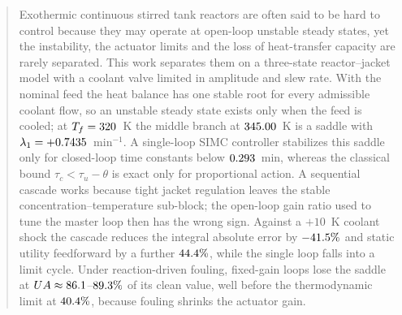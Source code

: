 \begin{abstract}
Exothermic continuous stirred tank reactors are often said to be hard to control because they may operate at open-loop unstable steady states, yet the instability, the actuator limits and the loss of heat-transfer capacity are rarely separated. This work separates them on a three-state reactor--jacket model with a coolant valve limited in amplitude and slew rate. With the nominal feed the heat balance has one stable root for every admissible coolant flow, so an unstable steady state exists only when the feed is cooled; at $T_f=\TfSad$~K the middle branch at $\TSad$~K is a saddle with $\lambda_1=+\lamASad$~min$^{-1}$. A single-loop SIMC controller stabilizes this saddle only for closed-loop time constants below $\tcMaxPI$~min, whereas the classical bound $\tau_c<\tau_u-\theta$ is exact only for proportional action. A sequential cascade works because tight jacket regulation leaves the stable concentration--temperature sub-block; the open-loop gain ratio used to tune the master loop then has the wrong sign. Against a $+10$~K coolant shock the cascade reduces the integral absolute error by $\iaeRedTjf\%$ and static utility feedforward by a further $\iaeRedFF\%$, while the single loop falls into a limit cycle. Under reaction-driven fouling, fixed-gain loops lose the saddle at $UA\approx\fstabCascade$--$\fstabSiso\%$ of its clean value, well before the thermodynamic limit at $\fcritSad\%$, because fouling shrinks the actuator gain.
\end{abstract}

